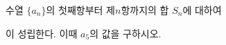 수열 $\{a_n\}$의 첫째항부터 제$n$항까지의 합 $S_n$에 대하여\par\smallskip{}\par\smallskip\noindent 이 성립한다. 이때 $a_5$의 값을 구하시오.
